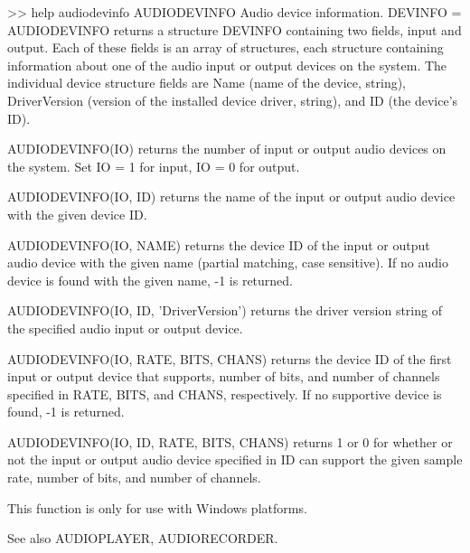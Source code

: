 >> help audiodevinfo   
 AUDIODEVINFO Audio device information.
    DEVINFO = AUDIODEVINFO returns a structure DEVINFO containing two fields, 
    input and output.  Each of these fields is an array of structures, each 
    structure containing information about one of the audio input or output 
    devices on the system.  The individual device structure fields are Name 
    (name of the device, string), DriverVersion (version of the installed 
    device driver, string), and ID (the device's ID).
 
    AUDIODEVINFO(IO) returns the number of input or output audio devices on 
    the system.  Set IO = 1 for input, IO = 0 for output.
 
    AUDIODEVINFO(IO, ID) returns the name of the input or output audio device 
    with the given device ID.
 
    AUDIODEVINFO(IO, NAME) returns the device ID of the input or output audio 
    device with the given name (partial matching, case sensitive).  If no 
    audio device is found with the given name, -1 is returned.
 
    AUDIODEVINFO(IO, ID, 'DriverVersion') returns the driver version string of 
    the specified audio input or output device.
 
    AUDIODEVINFO(IO, RATE, BITS, CHANS) returns the device ID of the first 
    input or output device that supports, number of bits, 
    and number of channels specified in RATE, BITS, and CHANS, respectively.
    If no supportive device is found, -1 is returned.
 
    AUDIODEVINFO(IO, ID, RATE, BITS, CHANS) returns 1 or 0 for whether or not 
    the input or output audio device specified in ID can support the given 
    sample rate, number of bits, and number of channels.
 
    This function is only for use with Windows platforms.
 
    See also AUDIOPLAYER, AUDIORECORDER. 
